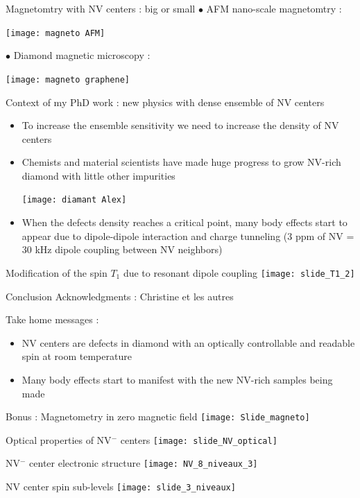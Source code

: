 \documentclass{beamer}
\begin{document}
\begin{frame}{Magnetomtry with NV centers : big or small}
$\bullet$ AFM nano-scale magnetomtry :
\begin{center}
\texttt{[image: magneto AFM]}
\end{center}


$\bullet$ Diamond magnetic microscopy :
\begin{center}
\texttt{[image: magneto graphene]}
\end{center}
\end{frame}

\begin{frame}{Context of my PhD work : new physics with dense ensemble of NV centers}
\begin{itemize}
\item To increase the ensemble sensitivity we need to increase the density of NV centers
\item Chemists and material scientists have made huge progress to grow NV-rich diamond with little other impurities 
\begin{center}
\texttt{[image: diamant Alex]}
\end{center}
\item When the defects density reaches a critical point, many body effects start to appear due to dipole-dipole interaction and charge tunneling (3 ppm of NV = 30 kHz dipole coupling between NV neighbors)
\end{itemize}
\end{frame}

\begin{frame}{Modification of the spin $T_1$ due to resonant dipole coupling}
\centering
\texttt{[image: slide\_T1\_2]}
\end{frame}
\begin{frame}{Conclusion}
Acknowledgments : Christine et les autres

\bigskip
Take home messages : 
\begin{itemize}
\item NV centers are defects in diamond with an optically controllable and readable spin at room temperature
\medskip
\item Many body effects start to manifest with the new NV-rich samples being made
\end{itemize}
\end{frame}
\begin{frame}{Bonus : Magnetometry in zero magnetic field}
\centering
\texttt{[image: Slide\_magneto]}
\end{frame}
\begin{frame}{Optical properties of NV$^-$ centers}
\centering
\texttt{[image: slide\_NV\_optical]}
\end{frame}
\begin{frame}{NV$^-$ center electronic structure}
\centering
\texttt{[image: NV\_8\_niveaux\_3]}
\end{frame}
\begin{frame}{NV center spin sub-levels}
\centering
\texttt{[image: slide\_3\_niveaux]}
\end{frame}
\end{document}
